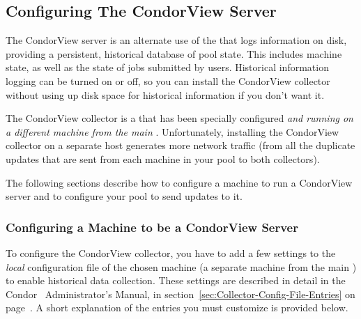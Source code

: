 \subsection{\label{sec:Contrib-CondorView-Install}
Configuring The CondorView Server}

The CondorView server is an alternate use of the
that logs information on disk, providing a 
persistent, historical database of pool state.
This includes machine state, as well as the state of jobs submitted by
users.
Historical information logging can be turned on or off, so you can
install the CondorView collector without using up disk space for
historical information if you don't want it.

The CondorView collector is a  that has been specially 
configured \emph{and running on a different machine from the main
}.
Unfortunately, installing the CondorView collector on a separate host
generates more network traffic (from all the duplicate updates that
are sent from each machine in your pool to both collectors).

The following sections describe how to configure a machine to run a
CondorView server and to configure your pool to send updates to it. 


\subsubsection{\label{sec:CondorView-Server-Setup}
Configuring a Machine to be a CondorView Server} 


To configure the CondorView collector, you have to add a few settings
to the \emph{local} configuration file of the chosen machine (a
separate machine from the main ) to enable
historical data collection.
These settings are described in detail in the Condor \VersionNotice\ 
Administrator's Manual, in
section~\ref{sec:Collector-Config-File-Entries} on
page~\pageref{sec:Collector-Config-File-Entries}.
A short explanation of the entries you must customize is provided
below.

